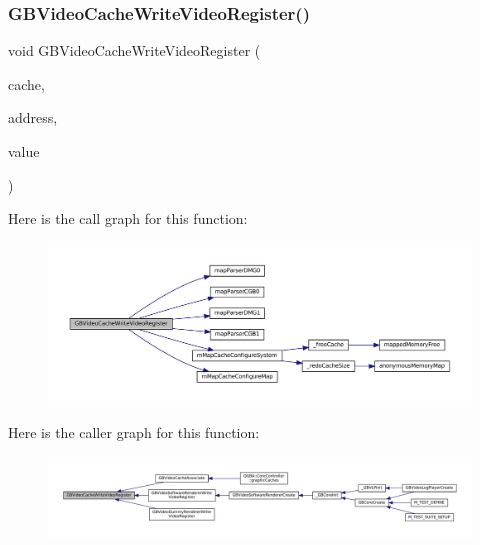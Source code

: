 \subsubsection{\texorpdfstring{G\+B\+Video\+Cache\+Write\+Video\+Register()}{GBVideoCacheWriteVideoRegister()}}
{\footnotesize\ttfamily void G\+B\+Video\+Cache\+Write\+Video\+Register (\begin{DoxyParamCaption}\item[{struct m\+Cache\+Set $\ast$}]{cache,  }\item[{uint16\+\_\+t}]{address,  }\item[{uint8\+\_\+t}]{value }\end{DoxyParamCaption})}

Here is the call graph for this function\+:
\nopagebreak
\begin{figure}[H]
\begin{center}
\leavevmode
\includegraphics[width=350pt]{gb_2renderers_2cache-set_8c_a30ce6f53accfe469551fc0454c23d53c_cgraph}
\end{center}
\end{figure}
Here is the caller graph for this function\+:
\nopagebreak
\begin{figure}[H]
\begin{center}
\leavevmode
\includegraphics[width=350pt]{gb_2renderers_2cache-set_8c_a30ce6f53accfe469551fc0454c23d53c_icgraph}
\end{center}
\end{figure}
\mbox{\label{gb_2renderers_2cache-set_8c_a7a94c69965062992b501b1ba7d9dfed3}} 
